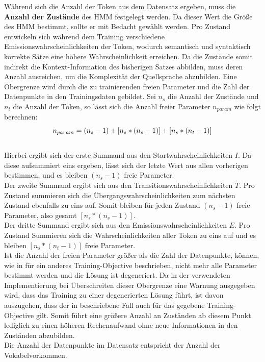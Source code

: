 \documentclass[conference]{IEEEtran}
\begin{document}
Während sich die Anzahl der Token aus dem Datensatz ergeben, muss die \textbf{Anzahl der Zustände} des HMM festgelegt werden. 
Da dieser Wert die Größe des HMM bestimmt, sollte er mit Bedacht gewählt werden.
Pro Zustand entwickeln sich während dem Training verschiedene Emissionswahrscheinlichkeiten der Token, wodurch semantisch und syntaktisch korrekte Sätze eine höhere Wahrscheinlichkeit erreichen.
Da die Zustände somit indirekt die Kontext-Information des bisherigen Satzes abbilden, muss deren Anzahl ausreichen, um die Komplexität der Quellsprache abzubilden.
Eine Obergrenze wird durch die zu trainierenden freien Parameter und die Zahl der Datenpunkte in den Trainingsdaten gebildet.
Sei $n_s$ die Anzahl der Zustände und $n_t$ die Anzahl der Token, so lässt sich die Anzahl freier Parameter $n_{param}$ wie folgt berechnen:
\begin{equation}\notag
n_{param} = (n_s-1) + [n_s * (n_s-1)] + [n_s * (n_t-1)]
\end{equation}\\
Hierbei ergibt sich der erste Summand aus den Startwahrscheinlichkeiten $I$. Da diese aufsummiert eins ergeben, lässt sich der letzte Wert aus allen vorherigen bestimmen, und es bleiben $(n_s-1)$ freie Parameter.\\
Der zweite Summand ergibt sich aus den Transitionswahrscheinlichkeiten $T$.
Pro Zustand summieren sich die Übergangswahrscheinlichkeiten zum nächsten Zustand ebenfalls zu eins auf.
Somit bleiben für jeden Zustand $(n_s-1)$ freie Parameter, also gesamt $[n_s * (n_s-1)]$.\\
Der dritte Summand ergibt sich aus den Emissionswahrscheinlichkeiten $E$.
Pro Zustand Summieren sich die Wahrscheinlichkeiten aller Token zu eins auf und es bleiben $[n_s * (n_t-1)]$ freie Parameter.\\
Ist die Anzahl der freien Parameter größer als die Zahl der Datenpunkte, können, wie in \cite{degenerate} für ein anderes Training-Objective beschrieben, nicht mehr alle Parameter bestimmt werden und die Lösung ist degeneriert.
Da in der verwendeten Implementierung bei Überschreiten dieser Obergrenze eine Warnung ausgegeben wird, dass das Training zu einer degenerierten Lösung führt, ist davon auszugehen, dass der in \cite{degenerate} beschriebene Fall auch für das gegebene Training-Objective gilt.
Somit führt eine größere Anzahl an Zuständen ab diesem Punkt lediglich zu einen höheren Rechenaufwand ohne neue Informationen in den Zuständen abzubilden.\\
Die Anzahl der Datenpunkte im Datensatz entspricht der Anzahl der Vokabelvorkommen.
\end{document}
